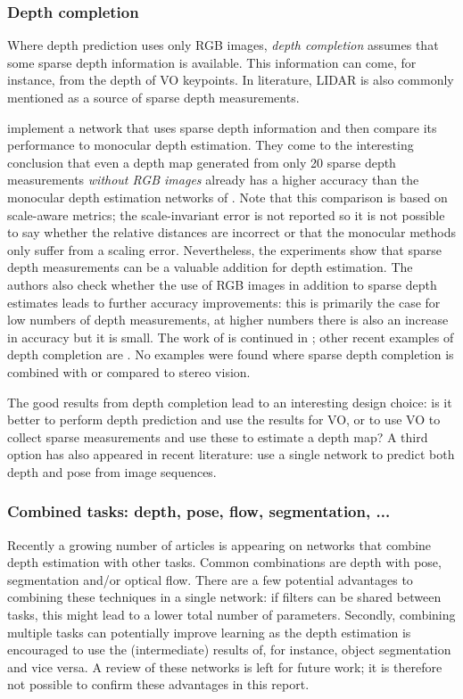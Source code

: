 \subsubsection{Depth completion}
Where depth prediction uses only RGB images, \emph{depth completion} assumes that some sparse depth information is available.
This information can come, for instance, from the depth of \ac{VO} keypoints.
In literature, LIDAR is also commonly mentioned as a source of sparse depth measurements.

\citeauthor{Ma2017} \cite{Ma2017} implement a network that uses sparse depth information and then compare its performance to monocular depth estimation.
They come to the interesting conclusion that even a depth map generated from only 20 sparse depth measurements \emph{without RGB images} already has a higher accuracy than the monocular depth estimation networks of \cite{Eigen2015,Laina2016}.
Note that this comparison is based on scale-aware metrics; the scale-invariant error \cite{Eigen2014} is not reported so it is not possible to say whether the relative distances are incorrect or that the monocular methods only suffer from a scaling error.
Nevertheless, the experiments show that sparse depth measurements can be a valuable addition for depth estimation.
The authors also check whether the use of RGB images in addition to sparse depth estimates leads to further accuracy improvements: this is primarily the case for low numbers of depth measurements, at higher numbers there is also an increase in accuracy but it is small.
The work of \citeauthor{Ma2017} is continued in \cite{Ma2018}; other recent examples of depth completion are \cite{Weerasekera2018,Jaritz2018a,Cheng2018a}.
No examples were found where sparse depth completion is combined with or compared to stereo vision.

The good results from depth completion lead to an interesting design choice: is it better to perform depth prediction and use the results for \ac{VO}, or to use \ac{VO} to collect sparse measurements and use these to estimate a depth map?
A third option has also appeared in recent literature: use a single network to predict both depth and pose from image sequences.

\subsubsection[Combined tasks]{Combined tasks: depth, pose, flow, segmentation, ...}
Recently a growing number of articles is appearing on networks that combine depth estimation with other tasks.
Common combinations are depth with pose, segmentation and/or optical flow.
There are a few potential advantages to combining these techniques in a single network: if filters can be shared between tasks, this might lead to a lower total number of parameters.
Secondly, combining multiple tasks can potentially improve learning as the depth estimation is encouraged to use the (intermediate) results of, for instance, object segmentation and vice versa.
A review of these networks is left for future work; it is therefore not possible to confirm these advantages in this report.





